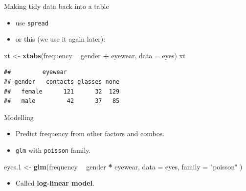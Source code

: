 \documentclass[ignorenonframetext,]{beamer}
\newenvironment{Shaded}{\begin{snugshade}}{\end{snugshade}}
\newcommand{\DataTypeTok}[1]{\textcolor[rgb]{0.13,0.29,0.53}{#1}}
\newcommand{\FloatTok}[1]{\textcolor[rgb]{0.00,0.00,0.81}{#1}}
\newcommand{\KeywordTok}[1]{\textcolor[rgb]{0.13,0.29,0.53}{\textbf{#1}}}
\newcommand{\NormalTok}[1]{#1}
\newcommand{\OperatorTok}[1]{\textcolor[rgb]{0.81,0.36,0.00}{\textbf{#1}}}
\newcommand{\StringTok}[1]{\textcolor[rgb]{0.31,0.60,0.02}{#1}}
\providecommand{\tightlist}{%
  \setlength{\itemsep}{0pt}\setlength{\parskip}{0pt}}
\begin{document}
\begin{frame}[fragile]{Making tidy data back into a table}
\protect\hypertarget{making-tidy-data-back-into-a-table}{}

\begin{itemize}
\tightlist
\item
  use \texttt{spread}
\item
  or this (we use it again later):
\end{itemize}

\begin{Shaded}
\begin{Highlighting}[]
\NormalTok{xt <-}\StringTok{ }\KeywordTok{xtabs}\NormalTok{(frequency }\OperatorTok{~}\StringTok{ }\NormalTok{gender }\OperatorTok{+}\StringTok{ }\NormalTok{eyewear, }\DataTypeTok{data =}\NormalTok{ eyes)}
\NormalTok{xt}
\end{Highlighting}
\end{Shaded}

\begin{verbatim}
##         eyewear
## gender   contacts glasses none
##   female      121      32  129
##   male         42      37   85
\end{verbatim}

\end{frame}

\begin{frame}[fragile]{Modelling}
\protect\hypertarget{modelling}{}

\begin{itemize}
\tightlist
\item
  Predict frequency from other factors and combos.
\item
  \texttt{glm} with \texttt{poisson} family.
\end{itemize}

\begin{Shaded}
\begin{Highlighting}[]
\NormalTok{eyes}\FloatTok{.1}\NormalTok{ <-}\StringTok{ }\KeywordTok{glm}\NormalTok{(frequency }\OperatorTok{~}\StringTok{ }\NormalTok{gender }\OperatorTok{*}\StringTok{ }\NormalTok{eyewear,}
  \DataTypeTok{data =}\NormalTok{ eyes,}
  \DataTypeTok{family =} \StringTok{"poisson"}
\NormalTok{)}
\end{Highlighting}
\end{Shaded}

\begin{itemize}
\tightlist
\item
  Called \textbf{log-linear model}.
\end{itemize}

\end{frame}
\end{document}
